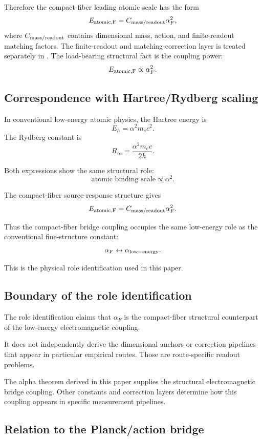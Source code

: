 Therefore the compact-fiber leading atomic scale has the form
\[
E_{\rm atomic,F}
=
C_{\rm mass/readout}\alpha_F^2,
\]
where \(C_{\rm mass/readout}\) contains dimensional mass, action, and finite-readout matching factors. The finite-readout and matching-correction layer is treated separately in \cite{Wells2026FiniteReadout}. The load-bearing structural fact is the coupling power:
\[
E_{\rm atomic,F}\propto \alpha_F^2.
\]

\subsection{Correspondence with Hartree/Rydberg scaling}

In conventional low-energy atomic physics, the Hartree energy is
\[
E_h=\alpha^2m_ec^2.
\]
The Rydberg constant is
\[
R_\infty=\frac{\alpha^2m_ec}{2h}.
\]

Both expressions show the same structural role:
\[
\text{atomic binding scale}\propto\alpha^2.
\]

The compact-fiber source-response structure gives
\[
E_{\rm atomic,F}
=
C_{\rm mass/readout}\alpha_F^2.
\]

Thus the compact-fiber bridge coupling occupies the same low-energy role as the conventional fine-structure constant:
\[
\alpha_F
\leftrightarrow
\alpha_{\rm low-energy}.
\]

This is the physical role identification used in this paper.

\subsection{Boundary of the role identification}

The role identification claims that \(\alpha_F\) is the compact-fiber structural counterpart of the low-energy electromagnetic coupling.

It does not independently derive the dimensional anchors or correction pipelines that appear in particular empirical routes. Those are route-specific readout problems.

The alpha theorem derived in this paper supplies the structural electromagnetic bridge coupling. Other constants and correction layers determine how this coupling appears in specific measurement pipelines.

\subsection{Relation to the Planck/action bridge}

